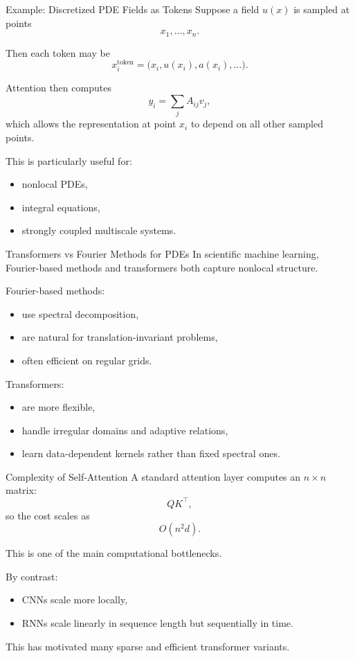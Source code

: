 \documentclass{beamer}
\begin{document}
\begin{frame}{Example: Discretized PDE Fields as Tokens}
  Suppose a field \(u(x)\) is sampled at points
  \[
  x_1,\dots,x_n.
  \]

  Then each token may be
  \[
  x_i^{\text{token}} = \big(x_i, u(x_i), a(x_i), \dots \big).
  \]

  Attention then computes
  \[
  y_i = \sum_j A_{ij} v_j,
  \]
  which allows the representation at point \(x_i\) to depend on all other sampled points.

  This is particularly useful for:
  \begin{itemize}
  \item nonlocal PDEs,
  \item integral equations,
  \item strongly coupled multiscale systems.
  \end{itemize}
\end{frame}

\begin{frame}{Transformers vs Fourier Methods for PDEs}
  In scientific machine learning, Fourier-based methods and transformers both capture nonlocal structure.

  Fourier-based methods:
  \begin{itemize}
  \item use spectral decomposition,
  \item are natural for translation-invariant problems,
  \item often efficient on regular grids.
  \end{itemize}

  Transformers:
  \begin{itemize}
  \item are more flexible,
  \item handle irregular domains and adaptive relations,
  \item learn data-dependent kernels rather than fixed spectral ones.
  \end{itemize}
\end{frame}

\begin{frame}{Complexity of Self-Attention}
  A standard attention layer computes an \(n\times n\) matrix:
  \[
  QK^\top,
  \]
  so the cost scales as
  \[
  O(n^2 d).
  \]

  This is one of the main computational bottlenecks.

  By contrast:
  \begin{itemize}
  \item CNNs scale more locally,
  \item RNNs scale linearly in sequence length but sequentially in time.
  \end{itemize}

  This has motivated many sparse and efficient transformer variants.
\end{frame}
\end{document}
